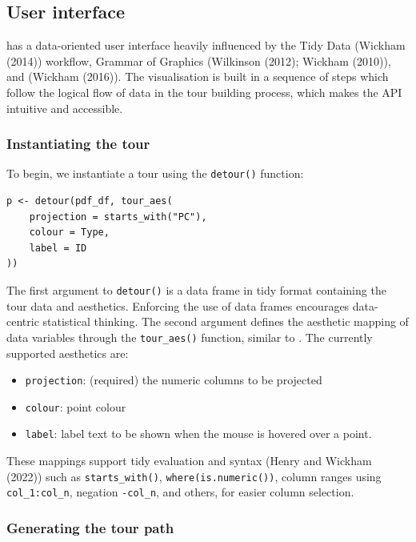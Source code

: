 \hypertarget{user-interface}{%
\subsection{User interface}\label{user-interface}}

 has a data-oriented user interface heavily influenced by the Tidy Data (Wickham (2014)) workflow, Grammar of Graphics (Wilkinson (2012); Wickham (2010)), and  (Wickham (2016)). The visualisation is built in a sequence of steps which follow the logical flow of data in the tour building process, which makes the API intuitive and accessible.

\hypertarget{instantiating-the-tour}{%
\subsubsection{Instantiating the tour}\label{instantiating-the-tour}}

To begin, we instantiate a tour using the \texttt{detour()} function:

\begin{verbatim}
p <- detour(pdf_df, tour_aes(
    projection = starts_with("PC"),
    colour = Type,
    label = ID
))
\end{verbatim}

The first argument to \texttt{detour()} is a data frame in tidy format containing the tour data and aesthetics. Enforcing the use of data frames encourages data-centric statistical thinking. The second argument defines the aesthetic mapping of data variables through the \texttt{tour\_aes()} function, similar to . The currently supported aesthetics are:

\begin{itemize}
\tightlist
\item
  \texttt{projection}: (required) the numeric columns to be projected
\item
  \texttt{colour}: point colour
\item
  \texttt{label}: label text to be shown when the mouse is hovered over a point.
\end{itemize}

These mappings support tidy evaluation and  syntax (Henry and Wickham (2022)) such as \texttt{starts\_with()}, \texttt{where(is.numeric())}, column ranges using \texttt{col\_1:col\_n}, negation \texttt{-col\_n}, and others, for easier column selection.

\hypertarget{generating-the-tour-path}{%
\subsubsection{Generating the tour path}\label{generating-the-tour-path}}

